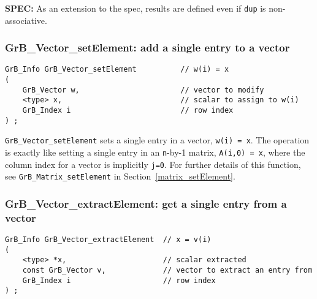 \documentclass[12pt]{article}
\begin{document}
\begin{spec}
{\bf SPEC:} As an extension to the spec, results are defined even if \verb'dup' is non-associative.
\end{spec}

\subsubsection{{\sf GrB\_Vector\_setElement:}    add a single entry to a vector}
\label{vector_setElement}

\begin{mdframed}[userdefinedwidth=6in]
{\footnotesize
\begin{verbatim}
GrB_Info GrB_Vector_setElement          // w(i) = x
(
    GrB_Vector w,                       // vector to modify
    <type> x,                           // scalar to assign to w(i)
    GrB_Index i                         // row index
) ;
\end{verbatim} } \end{mdframed}

\verb'GrB_Vector_setElement' sets a single entry in a vector, \verb'w(i) = x'.
The operation is exactly like setting a single entry in an \verb'n'-by-1
matrix, \verb'A(i,0) = x', where the column index for a vector is implicitly
\verb'j=0'.  For further details of this function, see
\verb'GrB_Matrix_setElement' in Section~\ref{matrix_setElement}.

\newpage
\subsubsection{{\sf GrB\_Vector\_extractElement:} get a single entry from a vector}
\label{vector_extractElement}

\begin{mdframed}[userdefinedwidth=6in]
{\footnotesize
\begin{verbatim}
GrB_Info GrB_Vector_extractElement  // x = v(i)
(
    <type> *x,                      // scalar extracted
    const GrB_Vector v,             // vector to extract an entry from
    GrB_Index i                     // row index
) ;
\end{verbatim} } \end{mdframed}
\end{document}
